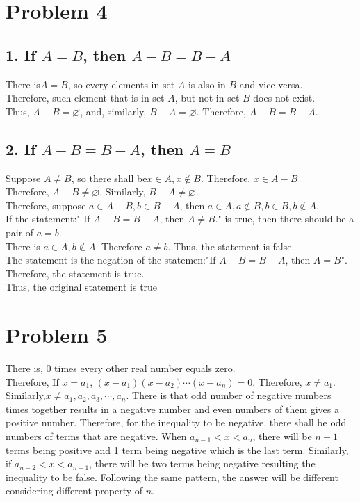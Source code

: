 \documentclass{article}
\begin{document}
\section*{Problem 4}
\subsection*{1. If \(A = B\), then \(A-B=B-A\)}
        There is\(A=B\), so every elements in set \(A\) is also in \(B\) and vice versa.\\
        Therefore, such element that is in set \(A\), but not in set \(B\) does not exist.\\
        Thus, \(A-B=\varnothing\), and, similarly, \(B-A = \varnothing\). 
        Therefore, \(A-B = B-A\).\\
\subsection*{2. If \(A-B=B-A\), then \(A = B\)}
        Suppose \(A\neq B\), so there shall be\(x \in A, x\notin B\). Therefore, \(x\in A-B\)\\
        Therefore, \(A-B \neq \varnothing\). Similarly, \(B-A \neq \varnothing\).\\
        Therefore, suppose \(a \in A-B, b \in B-A\), then \(a \in A, a\notin B, b\in B, b\notin A\).\\
        If the statement:" If \(A-B=B-A\), then \(A\neq B\)." is true, then there should be a pair of \(a=b\).\\
        There is \(a \in A, b \notin A\). Therefore \(a\neq b\). Thus, the statement is false.\\
        The statement is the negation of the statemen:"If \(A-B=B-A\), then \(A = B\)".\\
        Therefore, the statement is true.\\
        
        Thus, the original statement is true

\section*{Problem 5}
    There is, \(0\) times every other real number equals zero. \\
    Therefore, If \(x ={a_1}\), \((x-a_1)(x-a_2)\cdots(x-a_n)=0\). Therefore, \(x\neq a_1\).\\
    Similarly,\(x\neq a_1, a_2, a_3, \cdots, a_n\). There is that odd number of negative numbers times together results in a negative number and even numbers of them gives a positive number.
    Therefore, for the inequality to be negative, there shall be odd numbers of terms that are negative.
    When \(a_{n-1}<x<a_n\), there will be \(n-1\) terms being positive and 1 term being negative which is the last term. 
    Similarly, if \(a_{n-2}<x<a_{n-1}\), there will be two terms being negative resulting the inequality to be false.
    Following the same pattern, the answer will be different considering different property of \(n\).
\end{document}
